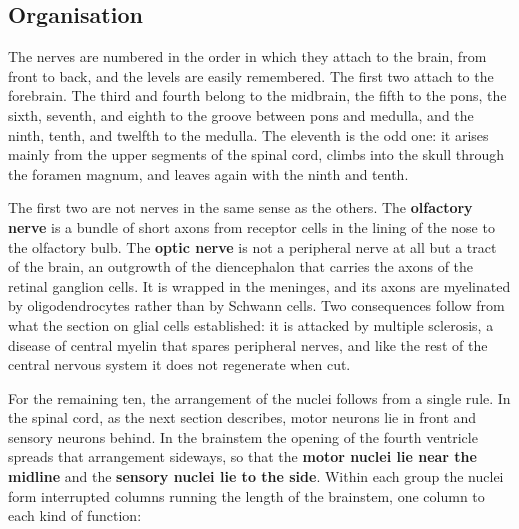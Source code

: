 \documentclass[11pt]{article}
\begin{document}
\subsection{Organisation}

The nerves are numbered in the order in which they attach to the brain, from front to back, and the levels are easily remembered. The first two attach to the forebrain. The third and fourth belong to the midbrain, the fifth to the pons, the sixth, seventh, and eighth to the groove between pons and medulla, and the ninth, tenth, and twelfth to the medulla. The eleventh is the odd one: it arises mainly from the upper segments of the spinal cord, climbs into the skull through the foramen magnum, and leaves again with the ninth and tenth.

The first two are not nerves in the same sense as the others. The \textbf{olfactory nerve} is a bundle of short axons from receptor cells in the lining of the nose to the olfactory bulb. The \textbf{optic nerve} is not a peripheral nerve at all but a tract of the brain, an outgrowth of the diencephalon that carries the axons of the retinal ganglion cells. It is wrapped in the meninges, and its axons are myelinated by oligodendrocytes rather than by Schwann cells. Two consequences follow from what the section on glial cells established: it is attacked by multiple sclerosis, a disease of central myelin that spares peripheral nerves, and like the rest of the central nervous system it does not regenerate when cut.

For the remaining ten, the arrangement of the nuclei follows from a single rule. In the spinal cord, as the next section describes, motor neurons lie in front and sensory neurons behind. In the brainstem the opening of the fourth ventricle spreads that arrangement sideways, so that the \textbf{motor nuclei lie near the midline} and the \textbf{sensory nuclei lie to the side}. Within each group the nuclei form interrupted columns running the length of the brainstem, one column to each kind of function:
\end{document}
